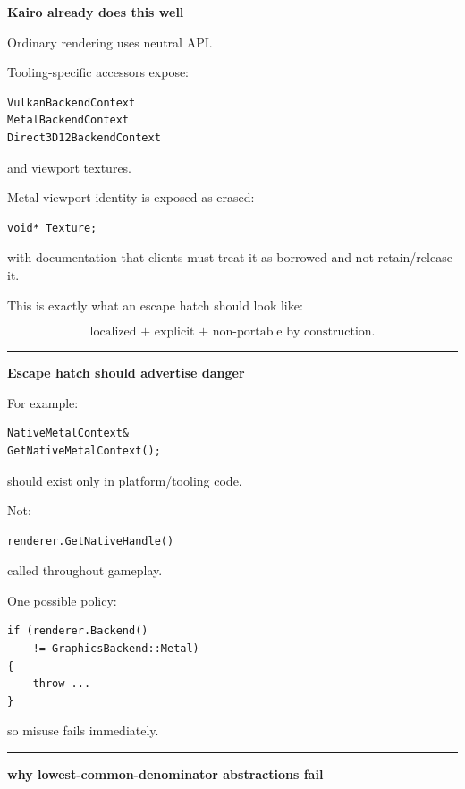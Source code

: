 \textbf{Kairo already does this well}

Ordinary rendering uses neutral API.

Tooling-specific accessors expose:

\begin{verbatim}
VulkanBackendContext
MetalBackendContext
Direct3D12BackendContext
\end{verbatim}

and viewport textures.

Metal viewport identity is exposed as erased:

\begin{verbatim}
void* Texture;
\end{verbatim}

with documentation that clients must treat it as borrowed and not retain/release it.

This is exactly what an escape hatch should look like:

\[
\boxed{
\text{localized + explicit + non-portable by construction}.
}
\]

\begin{center}\rule{0.5\linewidth}{0.5pt}\end{center}

\textbf{Escape hatch should advertise danger}

For example:

\begin{verbatim}
NativeMetalContext&
GetNativeMetalContext();
\end{verbatim}

should exist only in platform/tooling code.

Not:

\begin{verbatim}
renderer.GetNativeHandle()
\end{verbatim}

called throughout gameplay.

One possible policy:

\begin{verbatim}
if (renderer.Backend()
    != GraphicsBackend::Metal)
{
    throw ...
}
\end{verbatim}

so misuse fails immediately.

\begin{center}\rule{0.5\linewidth}{0.5pt}\end{center}

\textbf{why lowest-common-denominator abstractions fail}

